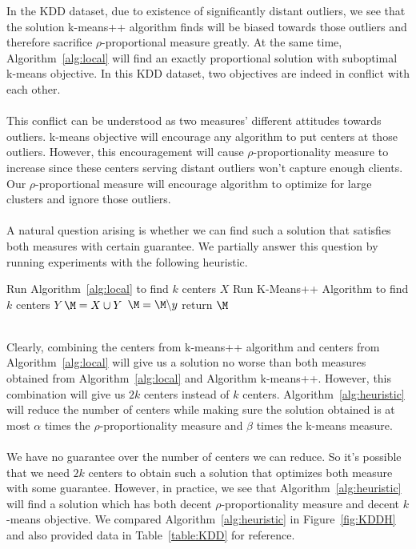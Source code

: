 In the KDD dataset, due to existence of significantly distant outliers, we see that the solution k-means++ algorithm finds will be biased towards those outliers and therefore sacrifice $\rho$-proportional measure greatly. At the same time, Algorithm~\ref{alg:local} will find an exactly proportional solution with suboptimal k-means objective. In this KDD dataset, two objectives are indeed in conflict with each other. \\~\\
This conflict can be understood as two measures' different attitudes towards outliers.  k-means objective will encourage any algorithm to put centers at those outliers. However, this encouragement will cause $\rho$-proportionality measure to increase since these centers serving distant outliers won't capture enough clients. Our $\rho$-proportional measure will encourage algorithm to optimize for large clusters and ignore those outliers. \\~\\
A natural question arising is whether we can find such a solution that satisfies both measures with certain guarantee. We partially answer this question by running experiments with the following heuristic.
\begin{algorithm}
	\begin{algorithmic}[1]
		\caption{Combination of K-Means++ and Local Capture}
		\label{alg:heuristic}
		\STATE Run Algorithm~\ref{alg:local} to find $k$ centers $X$
		\STATE Run K-Means++ Algorithm to find $k$ centers $Y$
		\STATE $\M = X \cup Y$
		\REPEAT
		\STATE $\M = \M \backslash y$
		\ENDIF
		\ENDFOR
		\STATE return $\M$
	\end{algorithmic}
\end{algorithm}~\\
Clearly, combining the centers from k-means++ algorithm and centers from Algorithm~\ref{alg:local} will give us a solution no worse than both measures obtained from Algorithm~\ref{alg:local} and Algorithm k-means++. However, this combination will give us $2k$ centers instead of $k$ centers. Algorithm~\ref{alg:heuristic} will reduce the number of centers while making sure the solution obtained is at most $\alpha$ times the $\rho$-proportionality measure and $\beta$ times the k-means measure.\\~\\
We have no guarantee over the number of centers we can reduce. So it's possible that we need $2k$ centers to obtain such a solution that optimizes both measure with some guarantee. However, in practice, we see that Algorithm~\ref{alg:heuristic} will find a solution which has both decent $\rho$-proportionality measure and decent $k$-means objective. We compared Algorithm~\ref{alg:heuristic} in Figure~\ref{fig:KDDH} and also provided data in Table~\ref{table:KDD} for reference.
